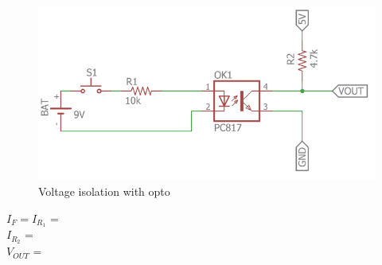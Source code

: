 \begin{figure}[H]
    \centering
    \includegraphics[width=12cm]{source/picture/bai_3/lab3_opto_de.png}
    \caption{Voltage isolation with opto}
    \label{lab3_opto_de}
\end{figure}

$I_F = I_{R_1}$ = \dotfill\bigskip\\
$I_{R_2}$ = \dotfill\bigskip\\
$V_{OUT}$ = \dotfill\bigskip\\
\begin{center}
    \dotfill\bigskip\par\mbox{}\dotfill\bigskip\\
    \dotfill\bigskip\par\mbox{}\dotfill\bigskip\\
    \dotfill\bigskip\par\mbox{}\dotfill\bigskip\\
    \dotfill\bigskip\par\mbox{}\dotfill\bigskip\\
    \dotfill\bigskip\par\mbox{}\dotfill\bigskip\\
\end{center}